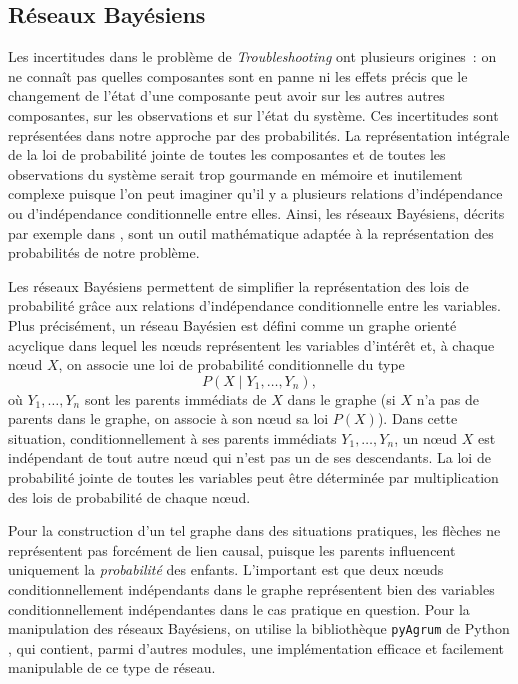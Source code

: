\documentclass[a4paper,11pt]{article}
\theoremstyle{plain}
\theoremstyle{definition}
\begin{document}

\subsection{Réseaux Bayésiens}
\label{SecReseauxBayesiens}

Les incertitudes dans le problème de \emph{Troubleshooting} ont plusieurs origines~: on ne connaît pas quelles composantes sont en panne ni les effets précis que le changement de l'état d'une composante peut avoir sur les autres autres composantes, sur les observations et sur l'état du système. Ces incertitudes sont représentées dans notre approche par des probabilités. La représentation intégrale de la loi de probabilité jointe de toutes les composantes et de toutes les observations du système serait trop gourmande en mémoire et inutilement complexe puisque l'on peut imaginer qu'il y a plusieurs relations d'indépendance ou d'indépendance conditionnelle entre elles. Ainsi, les réseaux Bayésiens, décrits par exemple dans \cite{Jensen_2007}, sont un outil mathématique adaptée à la représentation des probabilités de notre problème.

Les réseaux Bayésiens permettent de simplifier la représentation des lois de probabilité grâce aux relations d'indépendance conditionnelle entre les variables. Plus précisément, un réseau Bayésien est défini comme un graphe orienté acyclique dans lequel les nœuds représentent les variables d'intérêt et, à chaque nœud $X$, on associe une loi de probabilité conditionnelle du type
\[
P(X \mid Y_1, \dotsc, Y_n),
\]
où $Y_1, \dotsc, Y_n$ sont les parents immédiats de $X$ dans le graphe (si $X$ n'a pas de parents dans le graphe, on associe à son nœud sa loi $P(X)$). Dans cette situation, conditionnellement à ses parents immédiats $Y_1, \dotsc, Y_n$, un nœud $X$ est indépendant de tout autre nœud qui n'est pas un de ses descendants. La loi de probabilité jointe de toutes les variables peut être déterminée par multiplication des lois de probabilité de chaque nœud.

Pour la construction d'un tel graphe dans des situations pratiques, les flèches ne représentent pas forcément de lien causal, puisque les parents influencent uniquement la \emph{probabilité} des enfants. L'important est que deux nœuds conditionnellement indépendants dans le graphe représentent bien des variables conditionnellement indépendantes dans le cas pratique en question. Pour la manipulation des réseaux Bayésiens, on utilise la bibliothèque \texttt{pyAgrum} de Python \cite{Gonzales_2017}, qui contient, parmi d'autres modules, une implémentation efficace et facilement manipulable de ce type de réseau.
\end{document}
